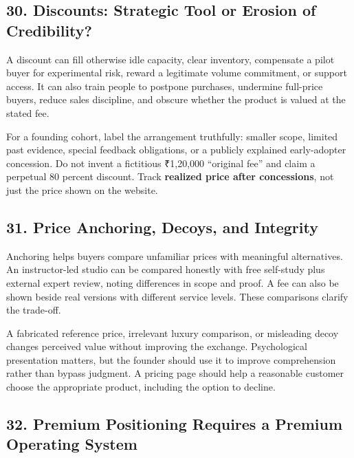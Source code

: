 \subsection*{30. Discounts: Strategic Tool or Erosion of Credibility?}

A discount can fill otherwise idle capacity, clear inventory, compensate a pilot buyer for experimental risk, reward a legitimate volume commitment, or support access. It can also train people to postpone purchases, undermine full-price buyers, reduce sales discipline, and obscure whether the product is valued at the stated fee.

For a founding cohort, label the arrangement truthfully: smaller scope, limited past evidence, special feedback obligations, or a publicly explained early-adopter concession. Do not invent a fictitious ₹1,20,000 ``original fee'' and claim a perpetual 80 percent discount. Track \textbf{realized price after concessions}, not just the price shown on the website.

\subsection*{31. Price Anchoring, Decoys, and Integrity}

Anchoring helps buyers compare unfamiliar prices with meaningful alternatives. An instructor-led studio can be compared honestly with free self-study plus external expert review, noting differences in scope and proof. A fee can also be shown beside real versions with different service levels. These comparisons clarify the trade-off.

A fabricated reference price, irrelevant luxury comparison, or misleading decoy changes perceived value without improving the exchange. Psychological presentation matters, but the founder should use it to improve comprehension rather than bypass judgment. A pricing page should help a reasonable customer choose the appropriate product, including the option to decline.

\subsection*{32. Premium Positioning Requires a Premium Operating System}

